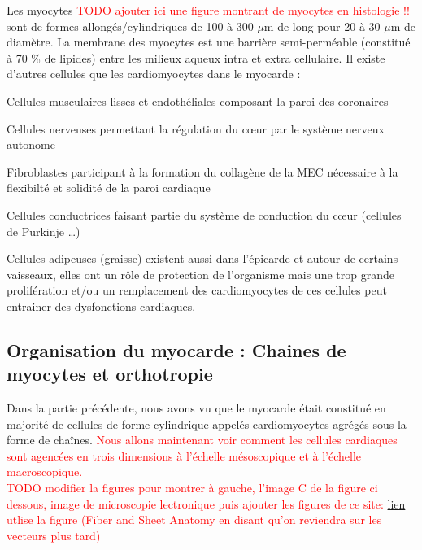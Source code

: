 Les myocytes \textcolor{red}{TODO ajouter ici une figure montrant de myocytes en histologie !!} sont de formes allongés/cylindriques de 100 à 300 $\mu$m de long pour 20 à 30 $\mu$m de diamètre. La membrane des myocytes est une barrière semi-perméable (constitué à 70  \% de lipides) entre les milieux aqueux intra et extra cellulaire. Il existe d’autres cellules que les cardiomyocytes dans le myocarde : 


 \begin{bulletList}
 \item Cellules musculaires lisses et endothéliales composant la paroi des coronaires
 \item Cellules nerveuses permettant la régulation du cœur par le système nerveux autonome
 \item Fibroblastes participant à la formation du collagène de la MEC nécessaire à la flexibilté et solidité de la paroi cardiaque \cite{BAYOMY2012823}
 \item Cellules conductrices faisant partie du système de conduction du cœur (cellules de Purkinje …)
 \item Cellules adipeuses (graisse) existent aussi dans l’épicarde et autour de certains vaisseaux, elles ont un rôle de protection de l’organisme mais une trop grande prolifération et/ou un remplacement des cardiomyocytes de ces cellules peut entrainer des dysfonctions cardiaques. \cite{samanta_role_2016} \cite{hatem_epicardial_2014}
\end{bulletList}



\subsection{Organisation du myocarde : Chaines de myocytes et orthotropie}

Dans la partie précédente, nous avons vu que le myocarde était constitué en majorité de cellules de forme cylindrique appelés cardiomyocytes agrégés sous la forme de chaînes. \textcolor{red}{Nous allons maintenant voir comment les cellules cardiaques sont agencées en trois dimensions à l’échelle mésoscopique et à l'échelle macroscopique.}\\

\textcolor{red}{TODO modifier la figures pour montrer à gauche, l'image C de la figure ci dessous, image de microscopie lectronique puis ajouter les figures de ce site: \href{http://damien.rohmer.free.fr/documents/berkeley/fiber_tracking/report/html/fiber_tracking.html}{lien}
utlise la figure (Fiber and Sheet Anatomy en disant qu'on reviendra sur les vecteurs plus tard) }

